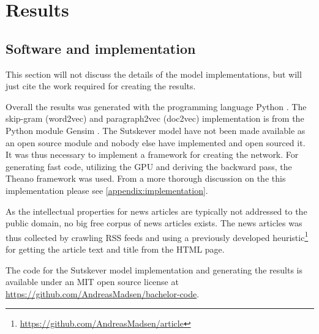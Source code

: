\chapter{Results}

\section{Software and implementation}
This section will not discuss the details of the model implementations, but will just cite the work required for creating the results.

Overall the results was generated with the programming language Python \cite{python}. The skip-gram (word2vec) and paragraph2vec (doc2vec) implementation is from the Python module Gensim \cite{gensim}. The Sutskever model \cite{sutskever} have not been made available as an open source module and nobody else have implemented and open sourced it. It was thus necessary to implement a framework for creating the network. For generating fast code, utilizing the GPU and deriving the backward pass, the Theano framework \cite{theano-a, theano-b} was used. From a more thorough discussion on the this implementation please see \autoref{appendix:implementation}.

As the intellectual properties for news articles are typically not addressed to the public domain, no big free corpus of news articles exists. The news articles was thus collected by crawling RSS feeds and using a previously developed heuristic\footnote{\url{https://github.com/AndreasMadsen/article}} for getting the article text and title from the HTML page.

The code for the Sutskever model implementation and generating the results is available under an MIT open source license at \url{https://github.com/AndreasMadsen/bachelor-code}.

\clearpage

\clearpage

\clearpage

